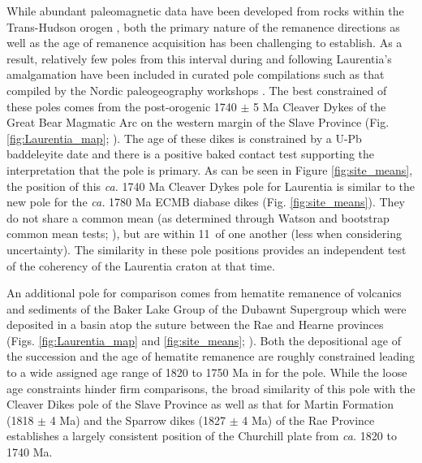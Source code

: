 \documentclass[draft]{agujournal2019}
\begin{document}
 While abundant paleomagnetic data have been developed from rocks within the Trans-Hudson orogen \cite{Symons2005a}, both the primary nature of the remanence directions as well as the age of remanence acquisition has been challenging to establish. As a result, relatively few poles from this interval during and following Laurentia's amalgamation have been included in curated pole compilations such as that compiled by the Nordic paleogeography workshops \cite{Evans2021a}. The best constrained of these poles comes from the post-orogenic 1740 $\pm$ 5 Ma Cleaver Dykes of the Great Bear Magmatic Arc on the western margin of the Slave Province (Fig. \ref{fig:Laurentia_map}; ). The age of these dikes is constrained by a U-Pb baddeleyite date and there is a positive baked contact test supporting the interpretation that the pole is primary. As can be seen in Figure \ref{fig:site_means}, the position of this \textit{ca.} 1740 Ma Cleaver Dykes pole for Laurentia \cite{Irving2004a} is similar to the new pole for the \textit{ca.} 1780 Ma ECMB diabase dikes (Fig. \ref{fig:site_means}). They do not share a common mean (as determined through Watson and bootstrap common mean tests; ), but are within 11\textdegree\ of one another (less when considering uncertainty). The similarity in these pole positions provides an independent test of the coherency of the Laurentia craton at that time.
 
 An additional pole for comparison comes from hematite remanence of volcanics and sediments of the Baker Lake Group of the Dubawnt Supergroup which were deposited in a basin atop the suture between the Rae and Hearne provinces (Figs. \ref{fig:Laurentia_map} and \ref{fig:site_means}; ). Both the depositional age of the succession and the age of hematite remanence are roughly constrained leading to a wide assigned age range of 1820 to 1750 Ma in  for the pole. While the loose age constraints hinder firm comparisons, the broad similarity of this pole with the Cleaver Dikes pole of the Slave Province as well as that for Martin Formation (1818 $\pm$ 4 Ma) and the Sparrow dikes (1827 $\pm$ 4 Ma) of the Rae Province establishes a largely consistent position of the Churchill plate from \textit{ca.} 1820 to 1740 Ma. 
 
\end{document}
